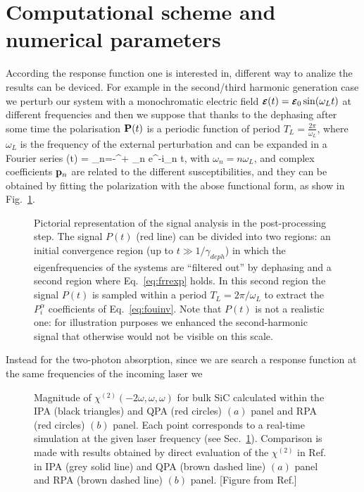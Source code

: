 \section{Computational scheme and numerical parameters}\label{sc:compdet}
According the response function one is interested in, different way to analize the results can be deviced. For example in the  second/third harmonic generation case we perturb our system with  a monochromatic electric field $\boldsymbol{\scriptstyle \cal E}(t) = \boldsymbol{\scriptstyle \cal E}_0 \sin(\omega_L t)$ at different frequencies and then we suppose that thanks to the dephasing after some time the  polarisation ${\bf P}(t)$ is a periodic function of period $T_L =\frac{2\pi}{\omega_L}$, where $\omega_L$ is the frequency of the external perturbation and can be expanded in a Fourier series
\be\label{eq:frrexp}
\PP(t) = \sum_{n=-\infty}^{+\infty} \pp_n e^{-i\omega_n t},
\ee  
with $\omega_n = n \omega_L$, and complex coefficients ${\bf p}_n$ are related to the different susceptibilities, and they can be obtained by fitting the polarization with the abose functional form, as show in Fig.~\ref{fg:ptanalysis}. 
\begin{figure}[ht]
\centering
{}
\caption{\footnotesize{Pictorial representation of the signal analysis in the post-processing step. The signal  $P(t)$ (red line) can be divided into two regions: an initial convergence region (up to $t\gg 1/\gamma_{deph}$) in which the eigenfrequencies of the systems are ``filtered out'' by dephasing and a second region where Eq.~\eqref{eq:frrexp} holds. In this second region the signal $P(t)$ is sampled within a period $T_L=2\pi/\omega_L$ to extract the $P^\alpha_i$ coefficients of Eq.~\ref{eq:fouinv}. Note that $P(t)$ is not a realistic one: for illustration purposes we enhanced the second-harmonic signal that otherwise would not be visible on this scale.}} 
\label{fg:ptanalysis}
\end{figure} 
Instead for the two-photon absorption, since we are search a response function at the same frequencies of the incoming laser we
\begin{figure}[ht]
\centering
{}
\caption{\footnotesize{Magnitude of $\chi^{(2)}(-2\omega,\omega,\omega)$ for bulk SiC calculated within the IPA (black triangles) and QPA (red circles) $(a)$ panel and RPA (red circles) $(b)$ panel. Each point corresponds to a real-time simulation at the given laser frequency (see Sec.~\ref{sc:compdet}). Comparison is made with results obtained \ai by direct evaluation of the $\chi^{(2)}$ in Ref.~\cite{PhysRevB.82.235201} in IPA (grey solid line) and QPA (brown dashed line) $(a)$  panel and RPA (brown dashed line) $(b)$ panel.  \label{fg:SiCQPRPA} [Figure from Ref.\cite{nloptics2013}]}}
\end{figure}
